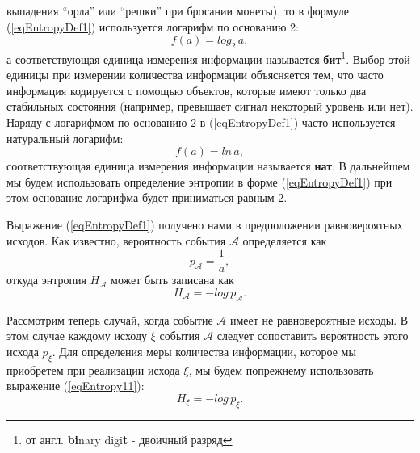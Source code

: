 выпадения ``орла'' или ``решки'' при бросании монеты), то в формуле
(\ref{eqEntropyDef1}) используется логарифм по основанию 2:
\begin{equation}
f\left(a\right) = log_2\,a,
\label{eqEntropyDefBit}
\end{equation}
а соответствующая единица измерения информации называется {\bf бит}\footnote{от
англ. {\bf{bi}}nary digi{\bf{t}} - двоичный разряд}. Выбор этой
единицы при измерении количества информации
объясняется тем, что часто информация кодируется с помощью объектов,
которые имеют только два стабильных состояния (например, превышает
сигнал некоторый уровень или нет). Наряду с логарифмом по основанию 2 в (\ref{eqEntropyDef1})
часто используется натуральный логарифм:
\begin{equation}
f\left(a\right) = ln\,a,
\label{eqEntropyDefNat}
\end{equation}
соответствующая единица измерения информации называется {\bf нат}. В
дальнейшем мы будем использовать определение энтропии в форме
(\ref{eqEntropyDef1}) при этом основание логарифма будет приниматься
равным 2.

Выражение (\ref{eqEntropyDef1}) получено нами в предположении
равновероятных исходов. Как известно, вероятность события
$\mathcal{A}$ определяется как
\[
p_{\mathcal{A}} = \frac{1}{a},
\]
откуда энтропия $H_{\mathcal{A}}$ может быть записана как
\begin{equation}
H_{\mathcal{A}} = -log \, p_{\mathcal{A}}.
\label{eqEntropy11}
\end{equation}

Рассмотрим теперь случай, когда событие $\mathcal{A}$ имеет не
равновероятные исходы. В этом случае каждому исходу $\xi$ события
$\mathcal{A}$ следует сопоставить вероятность этого исхода
$p_{\xi}$. Для определения меры количества информации, которое мы
приобретем при реализации исхода $\xi$, мы будем попрежнему
использовать выражение (\ref{eqEntropy11}):
\begin{equation}
H_{\xi} = -log \, p_{\xi}.
\label{eqEntropy12}
\end{equation}

